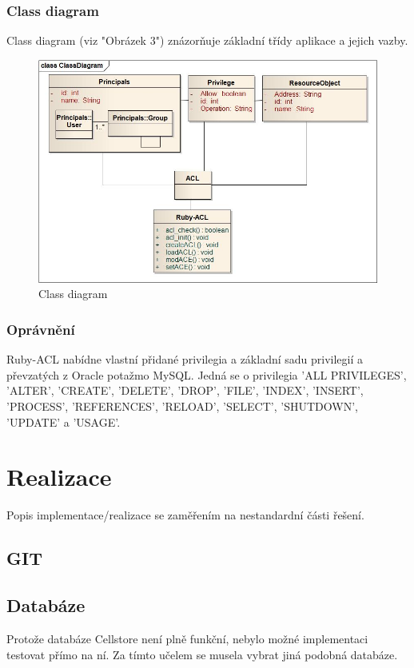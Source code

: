 \documentclass[11pt,twoside,a4paper]{book}
\begin{document}
\subsection{Class diagram}
Class diagram (viz "Obrázek 3") znázorňuje základní třídy aplikace a jejich vazby.
\begin{figure}
\includegraphics[width=15cm]{ClassDiagram2.jpg}
\caption{Class diagram}
\label{fig:Class diagram}
\end{figure}


\newpage
\subsection{Oprávnění}
Ruby-ACL nabídne vlastní přidané privilegia a základní sadu privilegií a převzatých z Oracle potažmo MySQL. Jedná se o privilegia 'ALL PRIVILEGES', 'ALTER', 'CREATE', 'DELETE', 'DROP', 'FILE', 'INDEX', 'INSERT', 'PROCESS', 'REFERENCES', 'RELOAD', 'SELECT', 'SHUTDOWN', 'UPDATE' a 'USAGE'.

\chapter{Realizace}
Popis implementace/realizace se zaměřením na nestandardní části řešení.

\section{GIT}
\section{Databáze}
Protože databáze Cellstore není plně funkční, nebylo možné implementaci testovat přímo na ní. Za tímto učelem se musela vybrat jiná podobná databáze.
\end{document}
